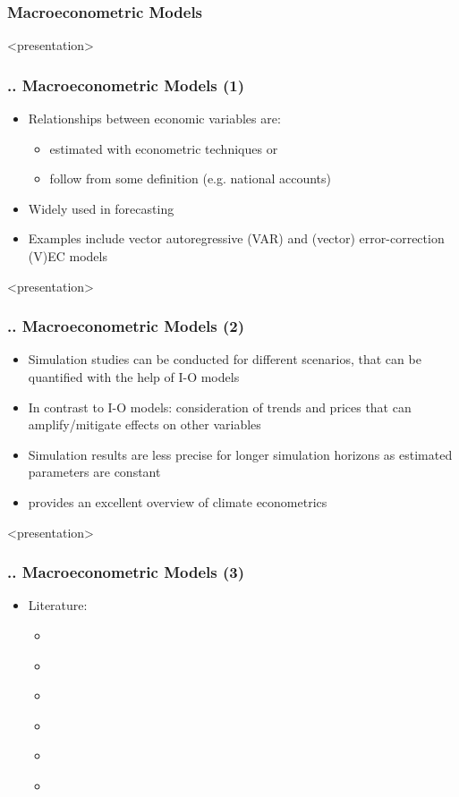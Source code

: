 \documentclass[11pt,aspectratio=169]{beamer}
\begin{document}
\subsubsection{Macroeconometric Models}
\begin{frame}<presentation>
	\frametitle{{\thesection.\thesubsection.\thesubsubsection} Macroeconometric Models (1)}
	\begin{itemize}		
		\item Relationships between economic variables are:
		\begin{itemize}
			\item estimated with econometric techniques or
			\item follow from some definition (e.g. national accounts) 
		\end{itemize}
			\item Widely used in forecasting 
			\item Examples include vector autoregressive (VAR) and (vector) error-correction (V)EC models
	\end{itemize}
\end{frame}
\begin{frame}<presentation>
	\frametitle{{\thesection.\thesubsection.\thesubsubsection} Macroeconometric Models (2)}
	\begin{itemize}	
		\item Simulation studies can be conducted for different scenarios, that can be quantified with the help of I-O models
		\item In contrast to I-O models: consideration of trends and prices that can amplify/mitigate effects on other variables
		\item Simulation results are less precise for longer simulation horizons as estimated parameters are constant
		\item \cite{hsiang2016climate} provides an excellent overview of climate econometrics
	\end{itemize}
\end{frame}
\begin{frame}<presentation>
	\frametitle{{\thesection.\thesubsection.\thesubsubsection} Macroeconometric Models (3)}	
	\begin{itemize}
		\item Literature:
		\begin{itemize}		
			\item \cite{bloesch2015}
			\item  \cite{colacito2018}
			\item  \cite{dell2012}
			\item \cite{Deryng2014}
			\item \cite{tol1995}
			\item \cite{zivin2014}
		\end{itemize}
	\end{itemize}	
\end{frame}
\end{document}
